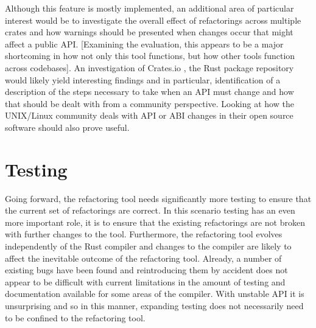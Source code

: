 

Although this feature is mostly implemented, an additional area of particular interest would be to investigate the overall effect of refactorings across multiple crates and how warnings should be presented when changes occur that might affect a public API. [Examining the evaluation, this appears to be a major shortcoming in how not only this tool functions, but how other tools function across codebases]. An investigation of Crates.io \cite{cratesio15}, the Rust package repository would likely yield interesting findings and in particular, identification of a description of the steps necessary to take when an API must change and how that should be dealt with from a community perspective. Looking at how the UNIX/Linux community deals with API or ABI changes in their open source software should also prove useful.

\section{Testing}
Going forward, the refactoring tool needs significantly more testing to ensure that the current set of refactorings are correct. In this scenario testing has an even more important role, it is to ensure that the existing refactorings are not broken with further changes to the tool. Furthermore, the refactoring tool evolves independently of the Rust compiler and changes to the compiler are likely to affect the inevitable outcome of the refactoring tool. Already, a number of existing bugs have been found and reintroducing them by accident does not appear to be difficult with current limitations in the amount of testing and documentation available for some areas of the compiler. With unstable API it is unsurprising and so in this manner, expanding testing does not necessarily need to be confined to the refactoring tool. 

